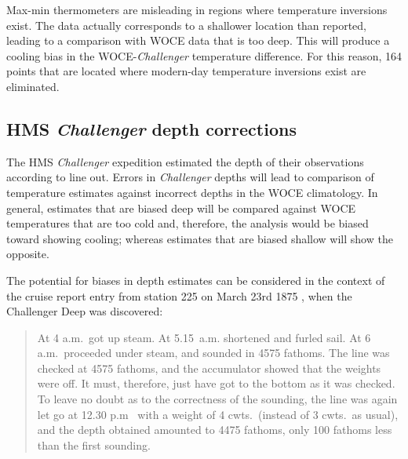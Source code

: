 \documentclass[12pt]{article}
\begin{document}
Max-min thermometers are misleading in regions where temperature inversions exist. The data actually corresponds to a shallower location than reported, leading to a comparison with WOCE data that is too deep. This will produce a cooling bias in the WOCE-{\it Challenger} temperature difference. For this reason, 164 points that are located where modern-day temperature inversions exist are eliminated.


\subsection{HMS {\it Challenger} depth corrections}

The HMS {\it Challenger} expedition estimated the depth of their
observations according to line out.  Errors in {\it Challenger} depths
will lead to comparison of temperature estimates against incorrect
depths in the WOCE climatology.  In general, estimates that are biased
deep will be compared against WOCE temperatures that are too cold and,
therefore, the analysis would be biased toward showing cooling;
whereas estimates that are biased shallow will show the opposite.

The potential for biases in depth estimates can be considered in the
context of the cruise report entry from station 225 on March 23rd 1875
\cite{Murray--1895:summary}, when the Challenger Deep was
discovered:
\begin{quote}
  At 4 a.m.~got up steam.  At 5.15~a.m. shortened and furled sail.
  At 6 a.m.~proceeded under steam, and sounded in 4575 fathoms.  The
  line was checked at 4575 fathoms, and the accumulator showed that
  the weights were off.  It must, therefore, just have got to the
  bottom as it was checked.  To leave no doubt as to the correctness
  of the sounding, the line was again let go at 12.30 p.m~ with a
  weight of 4 cwts.~(instead of 3 cwts.~as usual), and the depth
  obtained amounted to 4475 fathoms, only 100 fathoms less than the
  first sounding.
\end{quote}
\end{document}
